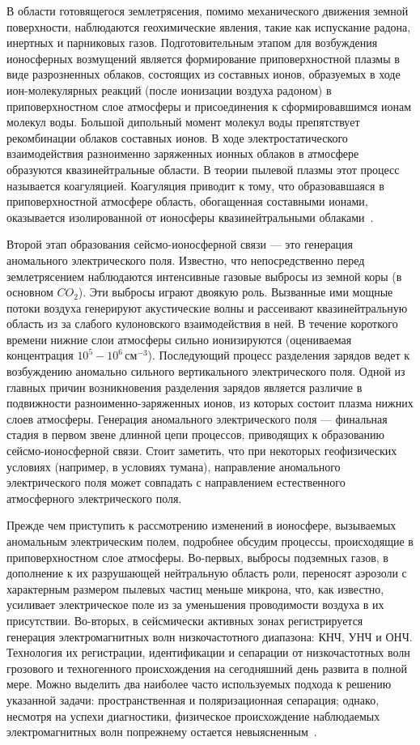 \documentclass[12pt, oneside, a4paper]{article}
\begin{document}
В области готовящегося землетрясения, помимо механического движения земной поверхности, наблюдаются геохимические явления, такие как испускание радона, инертных и парниковых газов. Подготовительным этапом для возбуждения ионосферных возмущений является формирование приповерхностной плазмы в виде разрозненных облаков, состоящих из составных ионов, образуемых в ходе ион-молекулярных реакций (после ионизации воздуха радоном) в приповерхностном слое атмосферы и присоединения к сформировавшимся ионам молекул воды. Большой дипольный момент молекул воды препятствует рекомбинации облаков составных ионов. В ходе электростатического взаимодействия разноименно заряженных ионных облаков в атмосфере образуются квазинейтральные области. В теории пылевой плазмы этот процесс называется коагуляцией. Коагуляция приводит к тому, что образовавшаяся в приповерхностной атмосфере область, обогащенная составными ионами, оказывается изолированной от ионосферы квазинейтральными облаками~\cite{Horanyi_Goertz:1990}.


Второй этап образования сейсмо-ионосферной связи --- это генерация аномального электрического поля. Известно, что непосредственно перед землетрясением наблюдаются интенсивные газовые выбросы из земной коры (в основном $CO_2$). Эти выбросы играют двоякую роль. Вызванные ими мощные потоки воздуха генерируют акустические волны и рассеивают квазинейтральную область из за слабого кулоновского взаимодействия в ней. В  течение короткого времени нижние слои атмосферы сильно ионизируются (оцениваемая концентрация $10^5-10^6$\,см$^{-3}$). Последующий процесс разделения зарядов ведет к возбуждению аномально сильного вертикального электрического поля. Одной из главных причин возникновения разделения зарядов является различие в подвижности разноименно-заряженных ионов, из которых состоит плазма нижних слоев атмосферы. Генерация аномального электрического поля --- финальная стадия в первом звене длинной цепи процессов, приводящих к образованию сейсмо-ионосферной связи. Стоит заметить, что при некоторых геофизических условиях (например, в условиях тумана), направление аномального электрического поля может совпадать с направлением естественного атмосферного электрического поля.

Прежде чем приступить к рассмотрению изменений в ионосфере, вызываемых аномальным электрическим полем,  подробнее обсудим  процессы, происходящие в приповерхностном слое атмосферы. Во-первых, выбросы подземных газов, в дополнение к их разрушающей нейтральную область роли, переносят аэрозоли с характерным размером пылевых частиц меньше микрона, что, как известно, усиливает электрическое поле из за уменьшения проводимости воздуха в их присутствии. Во-вторых, в сейсмически активных зонах регистрируется генерация электромагнитных волн низкочастотного диапазона: КНЧ, УНЧ и ОНЧ.  Технология их регистрации, идентификации и сепарации от низкочастотных волн грозового и техногенного происхождения на сегодняшний день развита в полной мере. Можно выделить два наиболее часто используемых подхода к решению указанной задачи: пространственная и поляризационная сепарация; однако, несмотря на успехи диагностики, физическое происхождение наблюдаемых электромагнитных волн попрежнему остается невыясненным~\cite{Jianguo:1989}.
\end{document}
